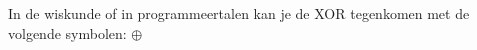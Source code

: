 In de wiskunde of in programmeertalen kan je de XOR tegenkomen met de volgende symbolen:
\begin{math}
\oplus \; 
\end{math}

